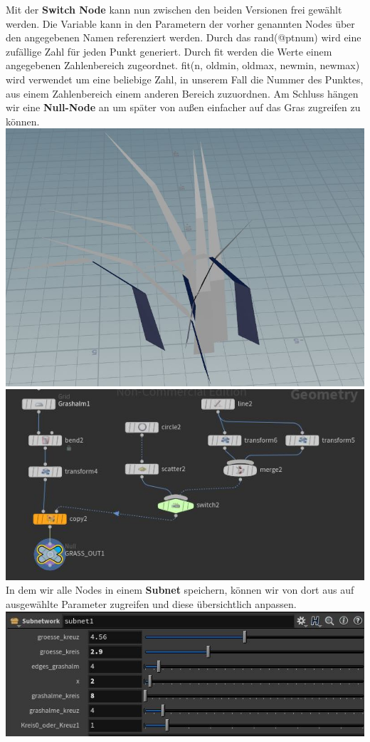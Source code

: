 \documentclass[paper=a4,fontsize=12pt,ngerman]{scrartcl}
\begin{document}
\begin{enumerate}
		Mit der \textbf{Switch Node} kann nun zwischen den beiden Versionen frei gewählt werden. 
		Die Variable kann in den Parametern der vorher genannten Nodes über den angegebenen Namen referenziert werden. Durch das rand(@ptnum) wird eine zufällige Zahl für jeden Punkt generiert. Durch fit werden die Werte einem angegebenen Zahlenbereich zugeordnet. fit(n, oldmin, oldmax, newmin, newmax) wird verwendet um eine beliebige Zahl, in unserem Fall die Nummer des Punktes, aus einem Zahlenbereich einem anderen Bereich zuzuordnen. Am Schluss hängen wir eine \textbf{Null-Node} an um später von außen einfacher auf das Gras zugreifen zu können. \\
		\includegraphics*[scale=0.3]{graphics/grass_final.jpg}
		\includegraphics*[scale=0.53]{graphics/grass_1.jpg}\\
		In dem wir alle Nodes in einem \textbf{Subnet} speichern, können wir von dort aus auf ausgewählte Parameter zugreifen und diese übersichtlich anpassen.\\
		\includegraphics*[width=\textwidth]{graphics/subnet.jpg}
	\end{enumerate}
	
\end{document}
